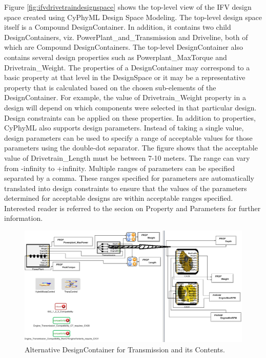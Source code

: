 Figure \ref{fig:ifvdrivetraindesignspace} shows the top-level view of the IFV design space created using CyPhyML Design Space Modeling. The top-level design space itself is a Compound DesignContainer. In addition, it contains two child DesignContainers, viz. PowerPlant\_and\_Transmission and Driveline, both of which are Compound DesignContainers. The top-level DesignContainer also contains several design properties such as Powerplant\_MaxTorque and Drivetrain\_Weight. The properties of a DesignContainer may correspond to a basic property at that level in the DesignSpace or it may be a representative property that is calculated based on the chosen sub-elements of the DesignContainer. For example, the value of Drivetrain\_Weight property in a design will depend on which components were selected in that particular design. Design constraints can be applied on these properties. In addition to properties, CyPhyML also supports design parameters. Instead of taking a single value, design parameters can be used to specify a range of acceptable values for those parameters using the double-dot separator. The figure shows that the acceptable value of Drivetrain\_Length must be between 7-10 meters. The range can vary from -infinity to +infinity. Multiple ranges of parameters can be specified separated by a comma. These ranges specified for parameters are automatically translated into design constraints to ensure that the values of the parameters determined for acceptable designs are within acceptable ranges specified. Interested reader is referred to the secion on Property and Parameters for further information.

\begin{figure}[t]
\centering
\includegraphics[scale=0.30]{Figures/AlternativeDesignContainer.png}
\caption{Alternative DesignContainer for Transmission and its Contents.}
\label{fig:alternativedesigncontainer}
\end{figure}


